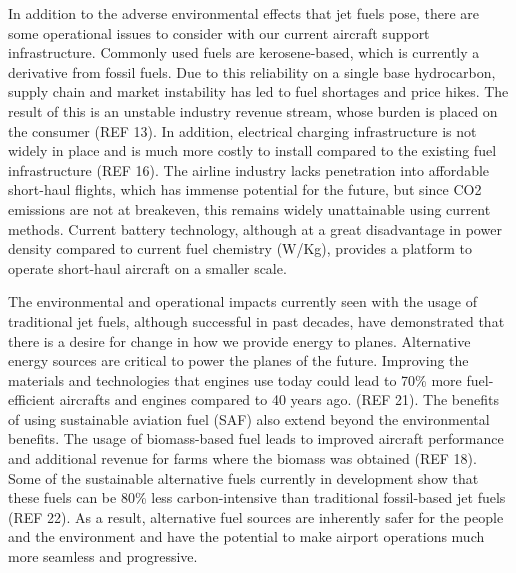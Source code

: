 \documentclass{article}
\begin{document}
In addition to the adverse environmental effects that jet fuels pose, there are some operational issues to consider with our current aircraft support infrastructure. 
Commonly used fuels are kerosene-based, which is currently a derivative from fossil fuels. Due to this reliability on a single base hydrocarbon, supply chain and market instability has led to fuel shortages and price hikes. 
The result of this is an unstable industry revenue stream, whose burden is placed on the consumer (REF 13). 
In addition, electrical charging infrastructure is not widely in place and is much more costly to install compared to the existing fuel infrastructure (REF 16). 
The airline industry lacks penetration into affordable short-haul flights, which has immense potential for the future, but since CO2 emissions are not at breakeven, this remains widely unattainable using current methods. 
Current battery technology, although at a great disadvantage in power density compared to current fuel chemistry (W/Kg), provides a platform to operate short-haul aircraft on a smaller scale.\par


The environmental and operational impacts currently seen with the usage of traditional jet fuels, although successful in past decades, have demonstrated that there is a desire for change in how we provide energy to planes. 
Alternative energy sources are critical to power the planes of the future. Improving the materials and technologies that engines use today could lead to 70\% more fuel-efficient aircrafts and engines compared to 40 years ago.  (REF 21). 
The benefits of using sustainable aviation fuel (SAF) also extend beyond the environmental benefits. 
The usage of biomass-based fuel leads to improved aircraft performance and additional revenue for farms where the biomass was obtained (REF 18). 
Some of the sustainable alternative fuels currently in development show that these fuels can be 80\% less carbon-intensive  than traditional fossil-based jet fuels (REF 22). 
As a result, alternative fuel sources are inherently safer for the people and the environment and have the potential to make airport operations much more seamless and progressive. \par 
\end{document}
